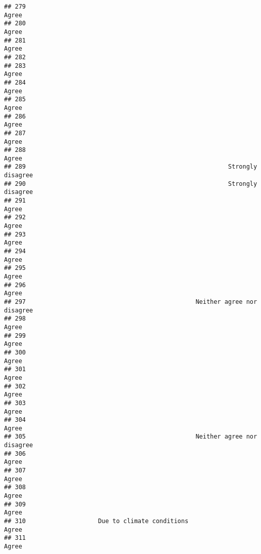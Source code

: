 \documentclass[
]{article}
\begin{document}
\begin{verbatim}
## 279                                                                    Agree
## 280                                                                    Agree
## 281                                                                    Agree
## 282                                                                         
## 283                                                                    Agree
## 284                                                                    Agree
## 285                                                                    Agree
## 286                                                                    Agree
## 287                                                                    Agree
## 288                                                                    Agree
## 289                                                        Strongly disagree
## 290                                                        Strongly disagree
## 291                                                                    Agree
## 292                                                                    Agree
## 293                                                                    Agree
## 294                                                                    Agree
## 295                                                                    Agree
## 296                                                                    Agree
## 297                                               Neither agree nor disagree
## 298                                                                    Agree
## 299                                                                    Agree
## 300                                                                    Agree
## 301                                                                    Agree
## 302                                                                    Agree
## 303                                                                    Agree
## 304                                                                    Agree
## 305                                               Neither agree nor disagree
## 306                                                                    Agree
## 307                                                                    Agree
## 308                                                                    Agree
## 309                                                                    Agree
## 310                    Due to climate conditions                       Agree
## 311                                                                    Agree

\end{verbatim}
\end{document}
